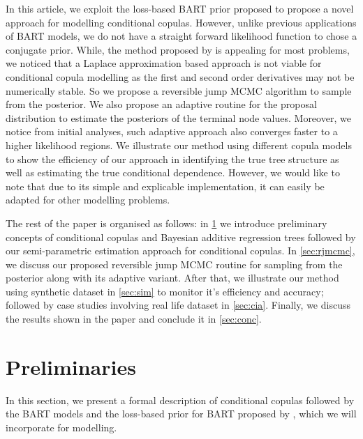 \documentclass{amsart}
\begin{document}
In this article, we exploit the loss-based BART prior proposed \citet{serafini2024lossbasedpriortreetopologies} to propose a novel approach for modelling conditional copulas. However, unlike previous applications of BART models, we do not have a straight forward likelihood function to chose a conjugate prior. While, the method proposed by \citet{Linero02012025} is appealing for most problems, we noticed that a Laplace approximation based approach is not
viable for conditional copula modelling as the first and second order derivatives may not be numerically stable. So we propose a reversible jump MCMC algorithm to sample from the posterior. We also propose an adaptive routine for the proposal distribution to estimate the posteriors of the terminal node values. Moreover, we notice from initial analyses, such adaptive approach also converges faster to a higher likelihood regions. We illustrate our method using different copula models to show the efficiency of our approach in identifying the true tree structure as well as estimating the true conditional dependence. However, we would like to note that due to its simple and explicable implementation, it can easily be adapted for other modelling problems. 

The rest of the paper is organised as follows: in \cref{sec:prelim} we introduce preliminary concepts of conditional copulas and Bayesian additive regression trees followed by our semi-parametric estimation approach for conditional copulas. In \cref{sec:rjmcmc}, we discuss our proposed reversible jump MCMC routine for sampling from the posterior along with its adaptive variant. After that, we illustrate our method using synthetic dataset in \cref{sec:sim} to monitor it's efficiency and accuracy; followed by case studies involving real life dataset in \cref{sec:cia}. Finally, we discuss the results shown in the paper and conclude it in \cref{sec:conc}.

\section{Preliminaries}\label{sec:prelim}

In this section, we present a formal description of conditional copulas followed by the BART models and the loss-based prior for BART proposed by \citet{serafini2024lossbasedpriortreetopologies}, which we will incorporate for modelling.
\end{document}
